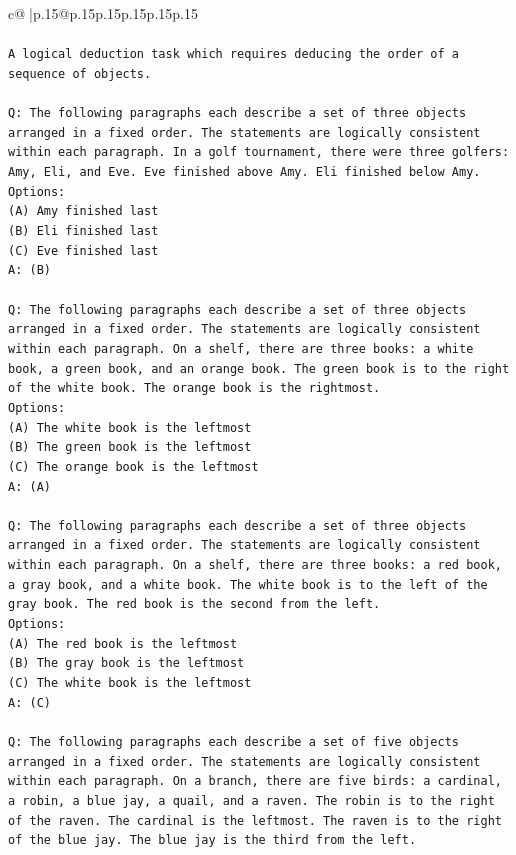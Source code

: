 \documentclass{article}
\begin{document}
{\begin{supertabular}{c@{$\;$}|p{.15\linewidth}@{}p{.15\linewidth}p{.15\linewidth}p{.15\linewidth}p{.15\linewidth}p{.15\linewidth}}
{{{\\ 
\\ 
\texttt{A logical deduction task which requires deducing the order of a sequence of objects.} \\
\\ 
\texttt{Q: The following paragraphs each describe a set of three objects arranged in a fixed order. The statements are logically consistent within each paragraph. In a golf tournament, there were three golfers: Amy, Eli, and Eve. Eve finished above Amy. Eli finished below Amy.} \\
\texttt{Options:} \\
\texttt{(A) Amy finished last} \\
\texttt{(B) Eli finished last} \\
\texttt{(C) Eve finished last} \\
\texttt{A: (B)} \\
\\ 
\texttt{Q: The following paragraphs each describe a set of three objects arranged in a fixed order. The statements are logically consistent within each paragraph. On a shelf, there are three books: a white book, a green book, and an orange book. The green book is to the right of the white book. The orange book is the rightmost.} \\
\texttt{Options:} \\
\texttt{(A) The white book is the leftmost} \\
\texttt{(B) The green book is the leftmost} \\
\texttt{(C) The orange book is the leftmost} \\
\texttt{A: (A)} \\
\\ 
\texttt{Q: The following paragraphs each describe a set of three objects arranged in a fixed order. The statements are logically consistent within each paragraph. On a shelf, there are three books: a red book, a gray book, and a white book. The white book is to the left of the gray book. The red book is the second from the left.} \\
\texttt{Options:} \\
\texttt{(A) The red book is the leftmost} \\
\texttt{(B) The gray book is the leftmost} \\
\texttt{(C) The white book is the leftmost} \\
\texttt{A: (C)} \\
\\ 
\texttt{Q: The following paragraphs each describe a set of five objects arranged in a fixed order. The statements are logically consistent within each paragraph. On a branch, there are five birds: a cardinal, a robin, a blue jay, a quail, and a raven. The robin is to the right of the raven. The cardinal is the leftmost. The raven is to the right of the blue jay. The blue jay is the third from the left.} \\
}}}
\end{supertabular}}
\end{document}
